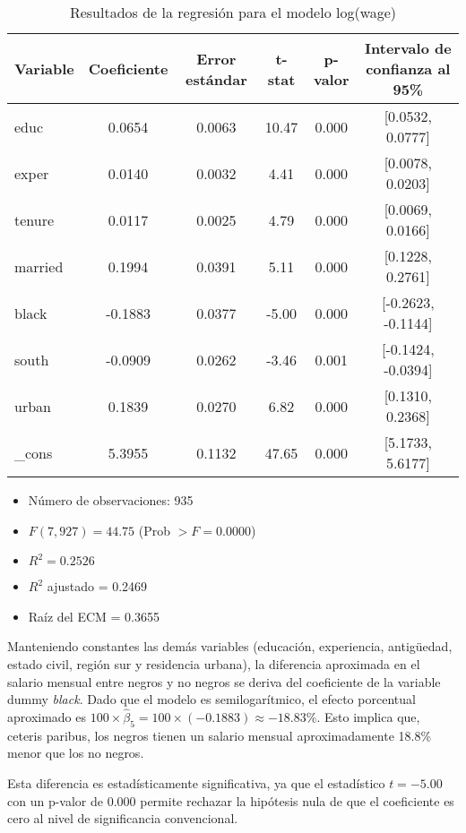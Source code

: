 \documentclass[12pt]{article}
\begin{document}
\begin{table}[h]
\centering
\begin{tabular}{lccccc}
\toprule
Variable & Coeficiente & Error estándar & t-stat & p-valor & Intervalo de confianza al 95\% \\
\midrule
educ     & 0.0654 & 0.0063 & 10.47 & 0.000 & [0.0532, 0.0777] \\
exper    & 0.0140 & 0.0032 & 4.41  & 0.000 & [0.0078, 0.0203] \\
tenure   & 0.0117 & 0.0025 & 4.79  & 0.000 & [0.0069, 0.0166] \\
married  & 0.1994 & 0.0391 & 5.11  & 0.000 & [0.1228, 0.2761] \\
black    & -0.1883 & 0.0377 & -5.00 & 0.000 & [-0.2623, -0.1144] \\
south    & -0.0909 & 0.0262 & -3.46 & 0.001 & [-0.1424, -0.0394] \\
urban    & 0.1839 & 0.0270 & 6.82  & 0.000 & [0.1310, 0.2368] \\
\_cons   & 5.3955 & 0.1132 & 47.65 & 0.000 & [5.1733, 5.6177] \\
\bottomrule
\end{tabular}
\caption{Resultados de la regresión para el modelo log(wage)}
\end{table}

\begin{itemize}
    \item Número de observaciones: 935
    \item \( F(7, 927) = 44.75 \) (Prob \( > F = 0.0000 \))
    \item \( R^2 = 0.2526 \)
    \item \( R^2 \) ajustado = 0.2469
    \item Raíz del ECM = 0.3655
\end{itemize}

Manteniendo constantes las demás variables (educación, experiencia, antigüedad, estado civil, región sur y residencia urbana), la diferencia aproximada en el salario mensual entre negros y no negros se deriva del coeficiente de la variable dummy \textit{black}. Dado que el modelo es semilogarítmico, el efecto porcentual aproximado es \( 100 \times \hat{\beta}_5 = 100 \times (-0.1883) \approx -18.83\% \). Esto implica que, ceteris paribus, los negros tienen un salario mensual aproximadamente 18.8\% menor que los no negros.

Esta diferencia es estadísticamente significativa, ya que el estadístico $ t = -5.00 $ con un p-valor de 0.000 permite rechazar la hipótesis nula de que el coeficiente es cero al nivel de significancia convencional.
\end{document}
